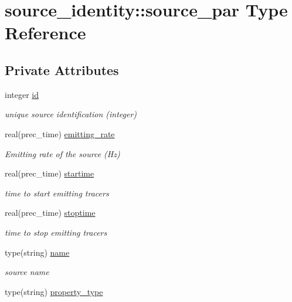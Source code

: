 \hypertarget{structsource__identity_1_1source__par}{}\section{source\+\_\+identity\+:\+:source\+\_\+par Type Reference}
\label{structsource__identity_1_1source__par}
\subsection*{Private Attributes}
\begin{DoxyCompactItemize}
\item 
integer \hyperlink{structsource__identity_1_1source__par_a05b6d325908a1b552f98dada275a3465}{id}
\begin{DoxyCompactList}\small\item\em unique source identification (integer) \end{DoxyCompactList}\item 
real(prec\+\_\+time) \hyperlink{structsource__identity_1_1source__par_a746a02960ffcba9f699ae45fa55dd8b4}{emitting\+\_\+rate}
\begin{DoxyCompactList}\small\item\em Emitting rate of the source (Hz) \end{DoxyCompactList}\item 
real(prec\+\_\+time) \hyperlink{structsource__identity_1_1source__par_a11cd864db9e9021cec4bd018d6fec295}{startime}
\begin{DoxyCompactList}\small\item\em time to start emitting tracers \end{DoxyCompactList}\item 
real(prec\+\_\+time) \hyperlink{structsource__identity_1_1source__par_a3ab5e22242b41bdcd56480b9d0496efa}{stoptime}
\begin{DoxyCompactList}\small\item\em time to stop emitting tracers \end{DoxyCompactList}\item 
type(string) \hyperlink{structsource__identity_1_1source__par_a71ef7dc8c6268d014247e0bca3005311}{name}
\begin{DoxyCompactList}\small\item\em source name \end{DoxyCompactList}\item 
type(string) \hyperlink{structsource__identity_1_1source__par_a3d7091aedcb1154665c1debba07bee2c}{property\+\_\+type}

\end{DoxyCompactItemize}
